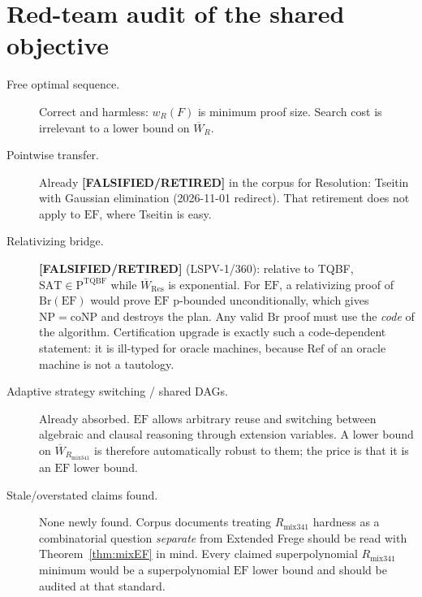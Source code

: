\documentclass[11pt]{article}
\theoremstyle{definition}
\theoremstyle{remark}
\newcommand{\SAT}{\mathrm{SAT}}
\newcommand{\EF}{\mathrm{EF}}
\newcommand{\Rmix}{R_{\mathrm{mix341}}}
\newcommand{\Wbar}{\overline W}
\newcommand{\Ref}{\mathrm{Ref}}
\newcommand{\status}[1]{\textbf{[#1]}}
\begin{document}
\section{Red-team audit of the shared objective}
\begin{description}
\item[Free optimal sequence.] Correct and harmless: $w_R(F)$ is minimum proof size. Search cost is irrelevant to a lower bound on $\Wbar_R$.
\item[Pointwise transfer.] Already \status{FALSIFIED/RETIRED} in the corpus for Resolution: Tseitin
  with Gaussian elimination (2026-11-01 redirect). That retirement does not apply to $\EF$, where
  Tseitin is easy.
\item[Relativizing bridge.] \status{FALSIFIED/RETIRED} (LSPV-1/360): relative to TQBF,
  $\SAT\in\mathrm P^{\mathrm{TQBF}}$ while $\Wbar_{\mathrm{Res}}$ is exponential. For $\EF$, a
  relativizing proof of $\mathrm{Br}(\EF)$ would prove $\EF$ p-bounded unconditionally,
  which gives $\mathrm{NP}=\mathrm{coNP}$ and destroys the plan. Any valid $\mathrm{Br}$ proof must use
  the \emph{code} of the algorithm. Certification upgrade is exactly such a code-dependent statement:
  it is ill-typed for oracle machines, because $\Ref$ of an oracle machine is not a tautology.
\item[Adaptive strategy switching / shared DAGs.] Already absorbed. $\EF$ allows arbitrary reuse
  and switching between algebraic and clausal reasoning through extension variables. A lower bound on
  $\Wbar_{\Rmix}$ is therefore automatically robust to them; the price is that it is an $\EF$ lower bound.
\item[Stale/overstated claims found.] None newly found. Corpus documents treating $\Rmix$
  hardness as a combinatorial question \emph{separate} from Extended Frege should be read with
  Theorem~\ref{thm:mixEF} in mind. Every claimed superpolynomial $\Rmix$ minimum would be a
  superpolynomial $\EF$ lower bound and should be audited at that standard.
\end{description}
\end{document}
